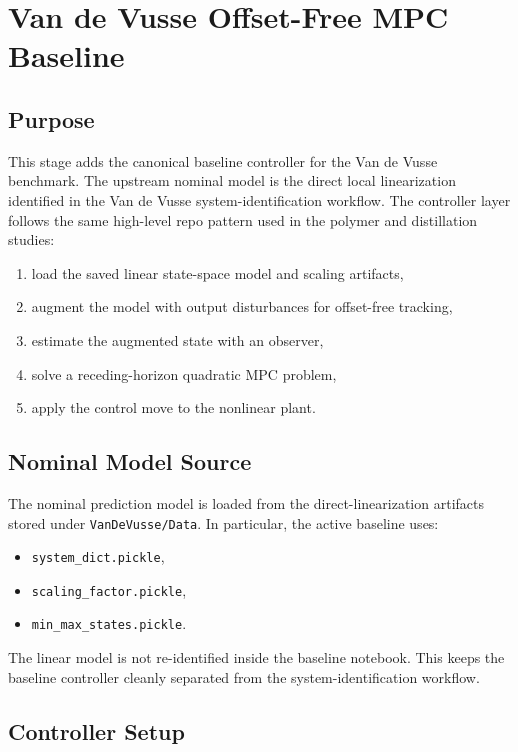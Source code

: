 \section{Van de Vusse Offset-Free MPC Baseline}

\subsection{Purpose}

This stage adds the canonical baseline controller for the Van de Vusse benchmark. The upstream nominal model is the direct local linearization identified in the Van de Vusse system-identification workflow. The controller layer follows the same high-level repo pattern used in the polymer and distillation studies:
\begin{enumerate}
    \item load the saved linear state-space model and scaling artifacts,
    \item augment the model with output disturbances for offset-free tracking,
    \item estimate the augmented state with an observer,
    \item solve a receding-horizon quadratic MPC problem,
    \item apply the control move to the nonlinear plant.
\end{enumerate}

\subsection{Nominal Model Source}

The nominal prediction model is loaded from the direct-linearization artifacts stored under \texttt{VanDeVusse/Data}. In particular, the active baseline uses:
\begin{itemize}
    \item \texttt{system\_dict.pickle},
    \item \texttt{scaling\_factor.pickle},
    \item \texttt{min\_max\_states.pickle}.
\end{itemize}

The linear model is not re-identified inside the baseline notebook. This keeps the baseline controller cleanly separated from the system-identification workflow.

\subsection{Controller Setup}

